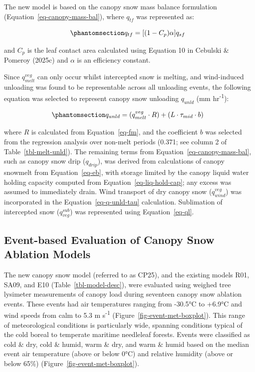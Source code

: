 \documentclass[
]{agujournal2019}
\begin{document}
The new model is based on the canopy snow mass balance formulation
(Equation~\ref{eq-canopy-mass-bal}), where \(q_{tf}\) was represented
as:

\begin{equation}\phantomsection\label{eq-qtf}{
q_{tf} = [(1 - C_p) \alpha] q_{sf}
}\end{equation}

and \(C_p\) is the leaf contact area calculated using Equation 10 in
Cebulski \& Pomeroy (2025c) and \(\alpha\) is an efficiency constant.

Since \(q_{melt}^{veg}\) can only occur whilst intercepted snow is
melting, and wind-induced unloading was found to be representable across
all unloading events, the following equation was selected to represent
canopy snow unloading \(q_{unld}\) (mm hr\textsuperscript{-1}):

\begin{equation}\phantomsection\label{eq-unld}{
q_{unld} = (q_{melt}^{veg} \cdot R) + (L \cdot \tau_{mid} \cdot b)
}\end{equation}

where \(R\) is calculated from Equation~\ref{eq-fm}, and the coefficient
\(b\) was selected from the regression analysis over non-melt periods
(0.371; see column 2 of Table~\ref{tbl-melt-unld}). The remaining terms
from Equation~\ref{eq-canopy-mass-bal}, such as canopy snow drip
(\(q_{drip}\)), was derived from calculations of canopy snowmelt from
Equation~\ref{eq-eb}, with storage limited by the canopy liquid water
holding capacity computed from Equation~\ref{eq-liq-hold-cap}; any
excess was assumed to immediately drain. Wind transport of dry canopy
snow (\(q_{wind}^{veg}\)) was incorporated in the
Equation~\ref{eq-q-unld-tau} calculation. Sublimation of intercepted
snow (\(q_{veg}^{sub}\)) was represented using Equation~\ref{eq-ql}.

\subsection{Event-based Evaluation of Canopy Snow Ablation
Models}\label{event-based-evaluation-of-canopy-snow-ablation-models}

The new canopy snow model (referred to as CP25), and the existing models
R01, SA09, and E10 (Table~\ref{tbl-model-desc}), were evaluated using
weighed tree lysimeter measurements of canopy load during seventeen
canopy snow ablation events. These events had air temperatures ranging
from -30.5°C to +6.9°C and wind speeds from calm to 5.3 m
s\textsuperscript{-1} (Figure~\ref{fig-event-met-boxplot}). This range
of meteorological conditions is particularly wide, spanning conditions
typical of the cold boreal to temperate maritime needleleaf forests.
Events were classified as cold \& dry, cold \& humid, warm \& dry, and
warm \& humid based on the median event air temperature (above or below
0°C) and relative humidity (above or below 65\%)
(Figure~\ref{fig-event-met-boxplot}).
\end{document}
